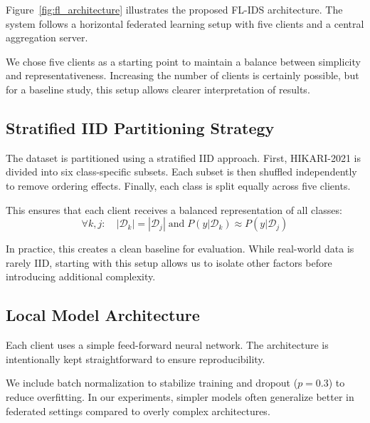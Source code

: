 \documentclass[conference]{IEEEtran}
\begin{document}
Figure~\ref{fig:fl_architecture} illustrates the proposed FL-IDS architecture. The system follows a horizontal federated learning setup with five clients and a central aggregation server.

We chose five clients as a starting point to maintain a balance between simplicity and representativeness. Increasing the number of clients is certainly possible, but for a baseline study, this setup allows clearer interpretation of results.

\subsection{Stratified IID Partitioning Strategy}

The dataset is partitioned using a stratified IID approach. First, HIKARI-2021 is divided into six class-specific subsets. Each subset is then shuffled independently to remove ordering effects. Finally, each class is split equally across five clients.

This ensures that each client receives a balanced representation of all classes:
\begin{equation}
    \forall k, j: \quad |\mathcal{D}_k| = |\mathcal{D}_j| \;\text{and}\; P(y|\mathcal{D}_k) \approx P(y|\mathcal{D}_j)
\end{equation}

In practice, this creates a clean baseline for evaluation. While real-world data is rarely IID, starting with this setup allows us to isolate other factors before introducing additional complexity.

\subsection{Local Model Architecture}

Each client uses a simple feed-forward neural network. The architecture is intentionally kept straightforward to ensure reproducibility.

We include batch normalization to stabilize training and dropout ($p = 0.3$) to reduce overfitting. In our experiments, simpler models often generalize better in federated settings compared to overly complex architectures.
\end{document}
